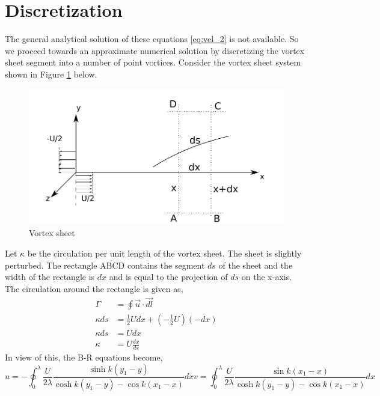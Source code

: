 \documentclass{article}
\begin{document}
\section{Discretization} 
The general analytical solution of these equations \eqref{eq:vel_2} is not available. So we proceed towards an approximate numerical solution by discretizing the vortex sheet segment into a number of point vortices. Consider the vortex sheet system shown in Figure \ref{fig:sheet} below. 
\begin{figure}[h]\label{fig:sheet}
\includegraphics{../img/BR_vortex_sheet.pdf}
\caption{Vortex sheet}
\end{figure}
Let $\kappa$ be the circulation per unit length of the vortex sheet. The sheet is slightly perturbed. The rectangle ABCD contains the segment $ds$ of the sheet and the width of the rectangle is $dx$ and is equal to the projection of $ds$ on the x-axis. The circulation around the rectangle is given as,
\begin{align*}
\Gamma &=\oint \vec{u}\cdot\vec{dl} \\
\kappa ds &= \frac{1}{2}Udx+(-\frac{1}{2}U)(-dx) \\
\kappa ds &= Udx \\
\kappa &= U\frac{dx}{ds}
\end{align*}
In view of this, the B-R equations become,
\begin{subequations}\label{eq:vel_3}
\begin{equation}
u= -\oint_0^{\lambda} \frac{U}{2\lambda} \frac{\sinh k(y_1-y)}{\cosh k(y_1-y)-\cos k(x_1-x)} dx
\end{equation}
\begin{equation}
v= \oint_0^{\lambda} \frac{U}{2\lambda} \frac{\sin k(x_1-x)}{\cosh k(y_1-y)-\cos k(x_1-x)} dx
\end{equation}
\end{subequations}
\end{document}
